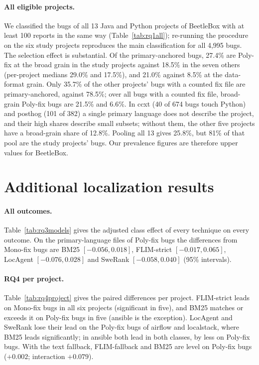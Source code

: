 \documentclass[10pt,a4paper]{article}
\begin{document}
\paragraph{All eligible projects.} We classified the bugs of all 13 Java and
Python projects of BeetleBox with at least 100 reports in the same way
(Table~\ref{tab:rq1all}); re-running the procedure on the six study projects
reproduces the main classification for all 4{,}995 bugs. The selection effect
is substantial. Of the primary-anchored bugs, 27.4\% are Poly-fix at the broad
grain in the study projects against 18.5\% in the seven others (per-project
medians 29.0\% and 17.5\%), and 21.0\% against 8.5\% at the data-format grain.
Only 35.7\% of the other projects' bugs with a counted fix file are
primary-anchored, against 78.5\%; over all bugs with a counted fix file,
broad-grain Poly-fix bugs are 21.5\% and 6.6\%. In ccxt (40 of 674 bugs touch
Python) and posthog (101 of 382) a single primary language does not describe
the project, and their high shares describe small subsets; without them, the
other five projects have a broad-grain share of 12.8\%. Pooling all 13 gives
25.8\%, but 81\% of that pool are the study projects' bugs. Our prevalence
figures are therefore upper values for BeetleBox.



\section{Additional localization results}\label{app:results}

\paragraph{All outcomes.} Table~\ref{tab:rq3models} gives the adjusted class
effect of every technique on every outcome. On the primary-language files of
Poly-fix bugs the differences from Mono-fix bugs are BM25 $[-0.056, 0.018]$,
FLIM-strict $[-0.017, 0.065]$, LocAgent $[-0.076, 0.028]$ and SweRank
$[-0.058, 0.040]$ (95\% intervals).



\paragraph{RQ4 per project.} Table~\ref{tab:rq4project} gives the paired
differences per project. FLIM-strict leads on Mono-fix bugs in all six projects
(significant in five), and BM25 matches or exceeds it on Poly-fix bugs in five
(ansible is the exception). LocAgent and SweRank lose their lead on the Poly-fix
bugs of airflow and localstack, where BM25 leads significantly; in ansible both
lead in both classes, by less on Poly-fix bugs. With the text fallback,
FLIM-fallback and BM25 are level on Poly-fix bugs ($+0.002$; interaction
$+0.079$).
\end{document}
